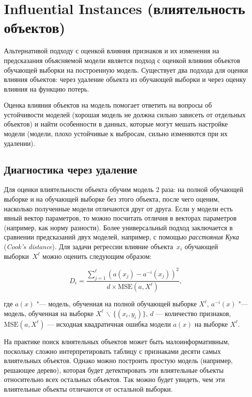 \documentclass[12pt,a4paper]{article}
\begin{document}
\section{Influential Instances (влиятельность объектов)}

Альтернативой подходу с оценкой влияния признаков и их изменения на предсказания объясняемой модели является подход с оценкой влияния объектов обучающей выборки на построенную модель. Существует два подхода для оценки влияния объектов: через удаление объекта из обучающей выборки и через оценку влияния на функцию потерь.

Оценка влияния объектов на модель помогает ответить на вопросы об устойчивости моделей (хорошая модель не должна сильно зависеть от отдельных объектов) и найти особенности в данных, которые могут мешать настройке модели (модели, плохо устойчивые к выбросам, сильно изменяются при их удалении).

\subsection{Диагностика через удаление}

Для оценки влиятельности объекта обучим модель 2 раза: на полной обучающей выборке и на обучающей выборке без этого объекта, после чего оценим, насколько полученные модели отличаются друг от друга. Если у модели есть явный вектор параметров, то можно посчитать отличия в векторах параметров (например, как норму разности). Более универсальный подход заключается в сравнении предсказаний двух моделей, например, с помощью \emph{расстояния Кука} (\emph{Cook's distance}). Для задачи регрессии влияние объекта~$x_i$ обучающей выборки~$X^\ell$ можно оценить следующим образом:

$$
D_i = \frac{\sum_{j=1}^\ell (a(x_j) - a^{-i}(x_j))^2}{d \times \text{MSE}(a, X^\ell)},
$$

где $a(x)$ "--- модель, обученная на полной обучающей выборке $X^\ell$, $a^{-i}(x)$ "--- модель, обученная на выборке $X^\ell \, \backslash \, \{(x_i, y_i)\}$,  $d$ --- количество признаков, $\text{MSE}(a, X^\ell)$ --- исходная квадратичная ошибка модели $a(x)$ на выборке $X^\ell$.

На практике поиск влиятельных объектов может быть малоинформативным, поскольку сложно интерпретировать таблицу с признаками десяти самых влиятельных объектов. Однако можно построить простую модель (например, решающее дерево), которая будет детектировать эти влиятельные объекты относительно всех остальных объектов. Так можно будет увидеть, чем эти влиятельные объекты отличаются от остальной выборки.
\end{document}
